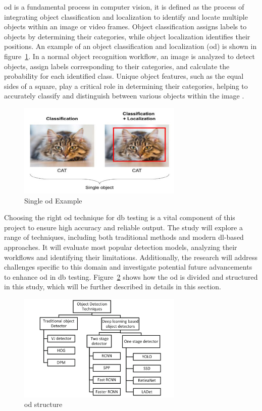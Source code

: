 \gls{od} is a fundamental process in computer vision, it is defined as the process of integrating object classification and localization to identify and locate multiple objects within an image or video frames. Object classification assigns labels to objects by determining their categories, while object localization identifies their positions. An example of an object classification and localization (\gls{od}) is shown in figure~\ref{Single_object}. In a normal object recognition workflow, an image is analyzed to detect objects, assign labels corresponding to their categories, and calculate the probability for each identified class. Unique object features, such as the equal sides of a square, play a critical role in determining their categories, helping to accurately classify and distinguish between various objects within the image \cite{oD_Review}.

\begin{figure}[ht]
    \centering
    \includegraphics[width=0.7\textwidth]{Figures/Object_detection.PNG} 
    \caption{Single \gls{od} Example \cite{oD_Review}}
    \label{Single_object}
\end{figure}

Choosing the right \gls{od} technique for \gls{db} testing is a vital component of this project to ensure high accuracy and reliable output. The study will explore a range of techniques, including both traditional methods and modern \gls{dl}-based approaches. It will evaluate most popular detection models, analyzing their workflows and identifying their limitations. Additionally, the research will address challenges specific to this domain and investigate potential future advancements to enhance \gls{od} in \gls{db} testing. Figure~\ref{OD_Mindmap} shows how the \gls{od} is divided and structured in this study, which will be further described in details in this section.

\begin{figure}[ht]
    \centering
    \includegraphics[width=0.7\textwidth]{Figures/OD_Mindmape.PNG} 
    \caption{\gls{od} structure \cite{oD_Review}}
    \label{OD_Mindmap}
\end{figure}

